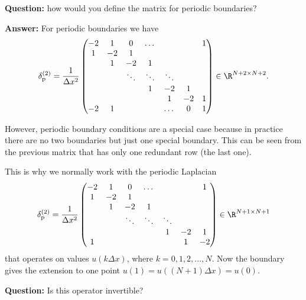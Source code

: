 \begin{frame}
	\textbf{Question:} how would you define the matrix for periodic boundaries? 
	
	\pause
	\textbf{Answer:} For periodic boundaries we have 
	\[ \delta^{(2)}_{\text{p}} = \frac{1}{\Delta x^2} \begin{pmatrix}
		-2 & 1 & 0 & \dots  &  & & 1 \\
		1 & -2 & 1  &   & &  &  \\
		& 1  & -2 & 1 &  &  & \\
		& & \ddots & \ddots & \ddots  & & \\
		& & & 1 & -2 & 1 & \\
		& & & & 1 & -2 & 1 \\
		-2 & 1 &  &  & \dots & 0 & 1
	\end{pmatrix} \in \R^{N+2 \times N+2}. \]
\end{frame}

\begin{frame}
	However, periodic boundary conditions are a special case because in practice there are no two boundaries but just one special boundary. This can be seen from the previous matrix that has only one redundant row (the last one). 
	
	\pause
	This is why we normally work with the periodic Laplacian 
	\[ \delta^{(2)}_{\text{p}} = \frac{1}{\Delta x^2} \begin{pmatrix}
		-2 & 1 & 0 & \dots  &  & & 1 \\
		1 & -2 & 1  &   & &  &  \\
		& 1  & -2 & 1 &  &  & \\
		& & \ddots & \ddots & \ddots  & & \\
		& & & & 1 & -2 & 1  \\
		1 & & & & & 1 & -2 
	\end{pmatrix} \in \R^{N+1 \times N+1} \]
	that operates on values $ u(k \Delta x) $, where $ k=0,1,2,...,N $.  Now the boundary gives the extension to one point $ u(1) = u((N+1)\Delta x) = u(0) $. 
	
	\pause
	\textbf{Question:} Is this operator invertible?
\end{frame}


